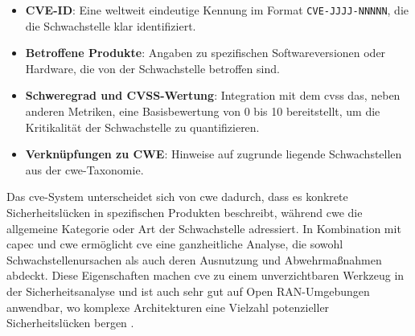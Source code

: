 \begin{itemize}
    \item \textbf{CVE-ID}: Eine weltweit eindeutige Kennung im Format \texttt{CVE-JJJJ-NNNNN}, die die Schwachstelle klar identifiziert.
    \item \textbf{Betroffene Produkte}: Angaben zu spezifischen Softwareversionen oder Hardware, die von der Schwachstelle betroffen sind.
    \item \textbf{Schweregrad und CVSS-Wertung}: Integration mit dem \gls{cvss} das, neben anderen Metriken, eine Basisbewertung von 0 bis 10 bereitstellt, um die Kritikalität der Schwachstelle zu quantifizieren.
    \item \textbf{Verknüpfungen zu CWE}: Hinweise auf zugrunde liegende Schwachstellen aus der \gls{cwe}-Taxonomie.
\end{itemize}

Das \gls{cve}-System unterscheidet sich von \gls{cwe} dadurch, dass es konkrete Sicherheitslücken in spezifischen Produkten beschreibt, während \gls{cwe} die allgemeine Kategorie oder Art der Schwachstelle adressiert. In Kombination mit \gls{capec} und \gls{cwe} ermöglicht \gls{cve} eine ganzheitliche Analyse, die sowohl Schwachstellenursachen als auch deren Ausnutzung und Abwehrmaßnahmen abdeckt. Diese Eigenschaften machen \gls{cve} zu einem unverzichtbaren Werkzeug in der Sicherheitsanalyse und ist auch sehr gut auf Open RAN-Umgebungen anwendbar, wo komplexe Architekturen eine Vielzahl potenzieller Sicherheitslücken bergen \cite{CVEWebsite}.
